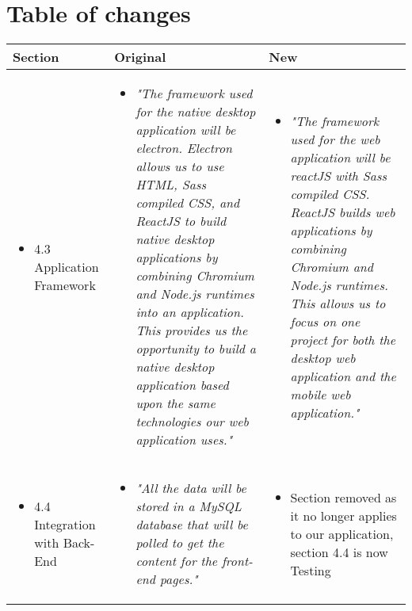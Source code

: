\documentclass[onecolumn, draftclsnofoot,10pt, compsoc]{IEEEtran}
\begin{document}
\section{Table of changes}

    \begin{longtable}{p{} | p{} | p{}}
    

        \textbf{Section}
        & \textbf{Original}
        & \textbf{New}
        \\\hline
        \begin{itemize}
            \item 4.3 Application Framework
        \end{itemize}
        & \begin{itemize}
            \item \textit{"The framework used for the native desktop application will be electron. Electron allows us to use HTML, Sass compiled CSS, and ReactJS to build native desktop applications by combining Chromium and Node.js runtimes into an application. This provides us the opportunity to build a native desktop application based upon the same technologies our web application uses."}
        \end{itemize}
        & \begin{itemize}
            \item \textit{"The framework used for the web application will be reactJS with Sass compiled CSS. ReactJS builds web applications by combining Chromium and Node.js runtimes. This allows us to focus on one project for both the desktop web application and the mobile web application."}
        \end{itemize}
        \\\hline
        \begin{itemize}
            \item 4.4 Integration with Back-End
        \end{itemize}
        & \begin{itemize}
            \item \textit{"All the data will be stored in a MySQL database that will be polled to get the content for the front-end pages."}
        \end{itemize}
        & \begin{itemize}
            \item Section removed as it no longer applies to our application, section 4.4 is now Testing
        \end{itemize}

\end{longtable}
\end{document}
